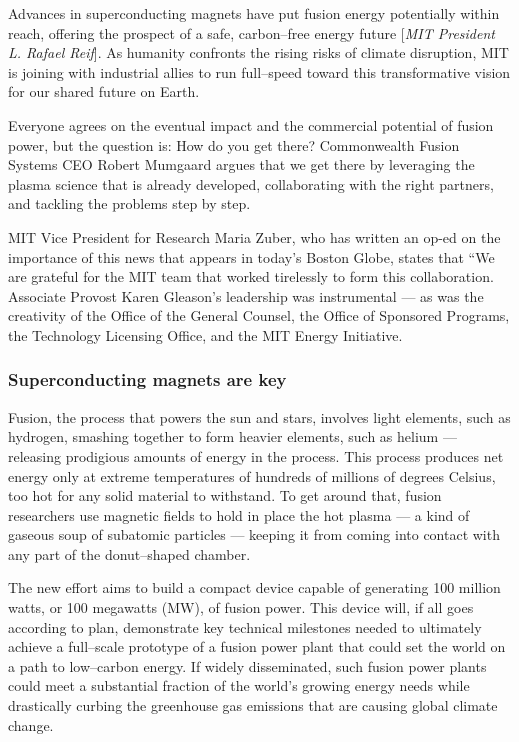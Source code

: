 \documentclass[a4paper,openany,12pt]{report}
\begin{document}
Advances in superconducting magnets have put fusion energy potentially within reach, offering the prospect of a safe, carbon--free energy future [\emph{MIT President L. Rafael Reif}]. As humanity confronts the rising risks of climate disruption, MIT is joining with industrial allies to run full--speed toward this transformative vision for our shared future on Earth.

Everyone agrees on the eventual impact and the commercial potential of fusion power, but the question is: How do you get there? Commonwealth Fusion Systems CEO Robert Mumgaard argues that we get there by leveraging the plasma science that is already developed, collaborating with the right partners, and tackling the problems step by step.

MIT Vice President for Research Maria Zuber, who has written an op-ed on the importance of this news that appears in today's Boston Globe, states that ``We are grateful for the MIT team that worked tirelessly to form this collaboration. Associate Provost Karen Gleason's leadership was instrumental --- as was the creativity of the Office of the General Counsel, the Office of Sponsored Programs, the Technology Licensing Office, and the MIT Energy Initiative.

\subsubsection{Superconducting magnets are key}

Fusion, the process that powers the sun and stars, involves light elements, such as hydrogen, smashing together to form heavier elements, such as helium --- releasing prodigious amounts of energy in the process. This process produces net energy only at extreme temperatures of hundreds of millions of degrees Celsius, too hot for any solid material to withstand. To get around that, fusion researchers use magnetic fields to hold in place the hot plasma --- a kind of gaseous soup of subatomic particles --- keeping it from coming into contact with any part of the donut--shaped chamber.

The new effort aims to build a compact device capable of generating 100 million watts, or 100 megawatts (MW), of fusion power. This device will, if all goes according to plan, demonstrate key technical milestones needed to ultimately achieve a full--scale prototype of a fusion power plant that could set the world on a path to low--carbon energy. If widely disseminated, such fusion power plants could meet a substantial fraction of the world's growing energy needs while drastically curbing the greenhouse gas emissions that are causing global climate change.
\end{document}
